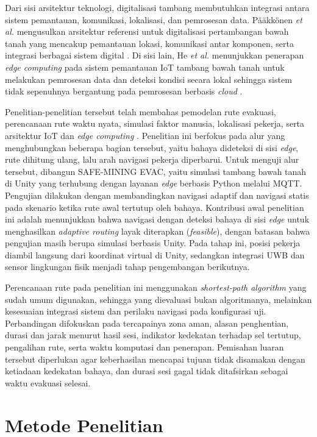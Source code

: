 \documentclass[10pt,a4paper]{article}
\begin{document}
Dari sisi arsitektur teknologi, digitalisasi tambang membutuhkan integrasi antara sistem pemantauan, komunikasi, lokalisasi, dan pemrosesan data. Pääkkönen \emph{et al.} mengusulkan arsitektur referensi untuk digitalisasi pertambangan bawah tanah yang mencakup pemantauan lokasi, komunikasi antar komponen, serta integrasi berbagai sistem digital \cite{paakkonen}. Di sisi lain, He \emph{et al.} menunjukkan penerapan \emph{edge computing} pada sistem pemantauan IoT tambang bawah tanah untuk melakukan pemrosesan data dan deteksi kondisi secara lokal sehingga sistem tidak sepenuhnya bergantung pada pemrosesan berbasis \emph{cloud} \cite{he}.

Penelitian-penelitian tersebut telah membahas pemodelan rute evakuasi, perencanaan rute waktu nyata, simulasi faktor manusia, lokalisasi pekerja, serta arsitektur IoT dan \emph{edge computing} \cite{jha,meij,bi,augustine,ziegler,paakkonen,he}. Penelitian ini berfokus pada alur yang menghubungkan beberapa bagian tersebut, yaitu bahaya dideteksi di sisi \emph{edge}, rute dihitung ulang, lalu arah navigasi pekerja diperbarui. Untuk menguji alur tersebut, dibangun SAFE-MINING EVAC, yaitu simulasi tambang bawah tanah di Unity yang terhubung dengan layanan \emph{edge} berbasis Python melalui MQTT. Pengujian dilakukan dengan membandingkan navigasi adaptif dan navigasi statis pada skenario ketika rute awal tertutup oleh bahaya. Kontribusi awal penelitian ini adalah menunjukkan bahwa navigasi dengan deteksi bahaya di sisi \emph{edge} untuk menghasilkan \emph{adaptive routing} layak diterapkan (\emph{feasible}), dengan batasan bahwa pengujian masih berupa simulasi berbasis Unity. Pada tahap ini, posisi pekerja diambil langsung dari koordinat virtual di Unity, sedangkan integrasi UWB dan sensor lingkungan fisik menjadi tahap pengembangan berikutnya.

Perencanaan rute pada penelitian ini menggunakan \emph{shortest-path algorithm} yang sudah umum digunakan, sehingga yang dievaluasi bukan algoritmanya, melainkan kesesuaian integrasi sistem dan perilaku navigasi pada konfigurasi uji. Perbandingan difokuskan pada tercapainya zona aman, alasan penghentian, durasi dan jarak menurut hasil sesi, indikator kedekatan terhadap sel tertutup, pengalihan rute, serta waktu komputasi dan penerapan. Pemisahan luaran tersebut diperlukan agar keberhasilan mencapai tujuan tidak disamakan dengan ketiadaan kedekatan bahaya, dan durasi sesi gagal tidak ditafsirkan sebagai waktu evakuasi selesai.

\section*{Metode Penelitian}
\end{document}
